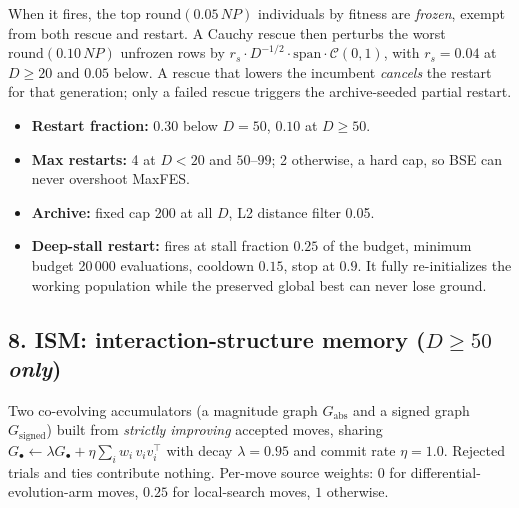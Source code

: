 \documentclass[11pt,a4paper]{article}
\begin{document}
When it fires, the top $\mathrm{round}(0.05\,NP)$ individuals by fitness are
\emph{frozen}, exempt from both rescue and restart. A Cauchy rescue then
perturbs the worst $\mathrm{round}(0.10\,NP)$ unfrozen rows by
$r_s \cdot D^{-1/2} \cdot \mathrm{span} \cdot \mathcal{C}(0,1)$, with
$r_s = 0.04$ at $D\geq20$ and $0.05$ below. A rescue that lowers the incumbent
\emph{cancels} the restart for that generation; only a failed rescue triggers
the archive-seeded partial restart.

\begin{itemize}[leftmargin=1.2em, itemsep=1pt, topsep=3pt]
\item \textbf{Restart fraction:} $0.30$ below $D=50$, $0.10$ at $D\geq50$.
\item \textbf{Max restarts:} 4 at $D<20$ and $50$--$99$; 2 otherwise, a hard
      cap, so BSE can never overshoot MaxFES.
\item \textbf{Archive:} fixed cap 200 at all $D$, L2 distance filter 0.05.
\item \textbf{Deep-stall restart:} fires at stall fraction $0.25$ of the
      budget, minimum budget 20\,000 evaluations, cooldown $0.15$, stop at
      $0.9$. It fully re-initializes the working population while the preserved
      global best can never lose ground.
\end{itemize}

\subsection{8. ISM: interaction-structure memory (\emph{$D\geq50$ only})}

Two co-evolving accumulators (a magnitude graph $G_{\mathrm{abs}}$ and a
signed graph $G_{\mathrm{signed}}$) built from \emph{strictly improving}
accepted moves, sharing
$G_\bullet \leftarrow \lambda G_\bullet + \eta\sum_i w_i\, v_i v_i^{\!\top}$
with decay $\lambda = 0.95$ and commit rate $\eta = 1.0$. Rejected trials and
ties contribute nothing. Per-move source weights: $0$ for
differential-evolution-arm moves, $0.25$ for local-search moves, $1$ otherwise.
\end{document}
